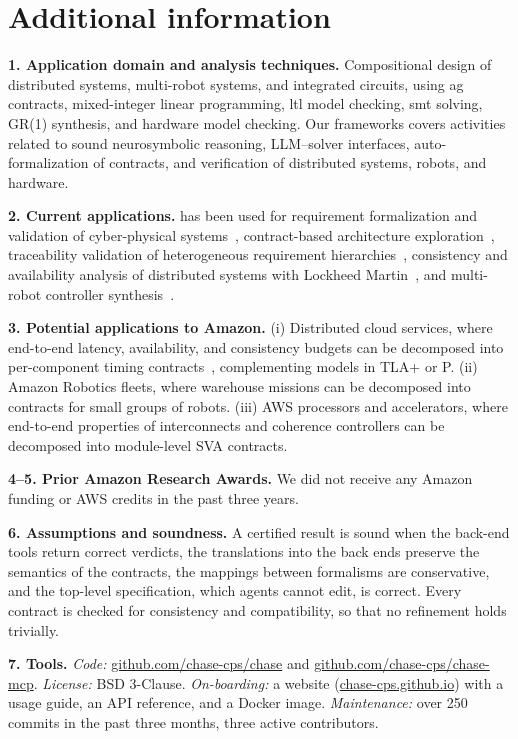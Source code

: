 \section{Additional information}

\textbf{1. Application domain and analysis techniques.} Compositional design of distributed systems, multi-robot systems, and {integrated circuits}, using \gls{ag} contracts, mixed-integer linear programming, \gls{ltl} model checking, \gls{smt} solving, GR(1) synthesis, and hardware model checking. Our frameworks  covers activities related to sound neurosymbolic reasoning, LLM--solver interfaces, auto-formalization of contracts, and verification of distributed systems, robots, and hardware.

\textbf{2. Current applications.} \chase has been used for requirement formalization and validation of cyber-physical systems~\cite{nuzzo2018chase}, contract-based architecture exploration~\cite{xiao2024contrarc,xiao2026smcp}, traceability validation of heterogeneous requirement hierarchies~\cite{naik2024contract}, consistency and availability analysis of distributed systems with Lockheed Martin~\cite{xiao2026memocode}, and multi-robot controller synthesis~\cite{xiao2026acies}.

\textbf{3. Potential applications to Amazon.} (i) Distributed cloud services, where end-to-end latency, availability, and consistency budgets can be decomposed into per-component timing contracts~\cite{xiao2026memocode}, complementing models in TLA+ or P. (ii) Amazon Robotics fleets, where warehouse missions can be decomposed into contracts for small groups of robots. (iii) AWS processors and accelerators, where end-to-end properties of interconnects and coherence controllers can be decomposed into module-level SVA contracts.

\textbf{4--5. Prior Amazon Research Awards.} {We did not receive any Amazon funding or AWS credits in the past three years}.

\textbf{6. Assumptions and soundness.} A certified result is sound when the back-end tools return correct verdicts, the translations into the back ends preserve the semantics of the contracts, the mappings between formalisms are conservative, and the top-level specification, which agents cannot edit, is correct. Every contract is checked for consistency and compatibility, so that no refinement holds trivially.

\textbf{7. Tools.} \emph{Code:} \href{https://github.com/chase-cps/chase}{github.com/chase-cps/chase} and \href{https://github.com/chase-cps/chase-mcp}{github.com/chase-cps/chase-mcp}. \emph{License:} BSD 3-Clause. \emph{On-boarding:} a website (\href{https://chase-cps.github.io}{chase-cps.github.io}) with a usage guide, an API reference, and a Docker image. \emph{Maintenance:} over 250 commits in the past three months, three active contributors.
